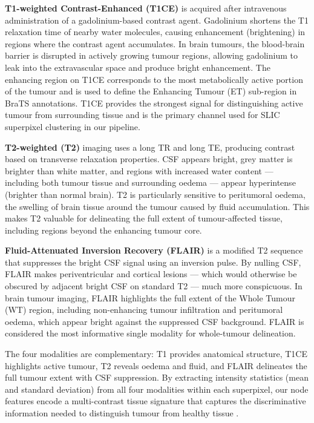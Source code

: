 \documentclass{article}
\begin{document}
\textbf{T1-weighted Contrast-Enhanced (T1CE)} is acquired after intravenous
administration of a gadolinium-based contrast agent. Gadolinium shortens the
T1 relaxation time of nearby water molecules, causing enhancement (brightening)
in regions where the contrast agent accumulates. In brain tumours, the
blood-brain barrier is disrupted in actively growing tumour regions, allowing
gadolinium to leak into the extravascular space and produce bright enhancement.
The enhancing region on T1CE corresponds to the most metabolically active
portion of the tumour and is used to define the Enhancing Tumour (ET)
sub-region in BraTS annotations. T1CE provides the strongest signal for
distinguishing active tumour from surrounding tissue and is the primary
channel used for SLIC superpixel clustering in our pipeline.

\textbf{T2-weighted (T2)} imaging uses a long TR and long TE, producing
contrast based on transverse relaxation properties. CSF appears bright,
grey matter is brighter than white matter, and regions with increased water
content --- including both tumour tissue and surrounding oedema --- appear
hyperintense (brighter than normal brain). T2 is particularly sensitive to
peritumoral oedema, the swelling of brain tissue around the tumour caused by
fluid accumulation. This makes T2 valuable for delineating the full extent of
tumour-affected tissue, including regions beyond the enhancing tumour core.

\textbf{Fluid-Attenuated Inversion Recovery (FLAIR)} is a modified T2
sequence that suppresses the bright CSF signal using an inversion pulse.
By nulling CSF, FLAIR makes periventricular and cortical lesions --- which
would otherwise be obscured by adjacent bright CSF on standard T2 --- much
more conspicuous. In brain tumour imaging, FLAIR highlights the full extent
of the Whole Tumour (WT) region, including non-enhancing tumour infiltration
and peritumoral oedema, which appear bright against the suppressed CSF
background. FLAIR is considered the most informative single modality for
whole-tumour delineation.

The four modalities are complementary: T1 provides anatomical structure, T1CE
highlights active tumour, T2 reveals oedema and fluid, and FLAIR delineates
the full tumour extent with CSF suppression. By extracting intensity statistics
(mean and standard deviation) from all four modalities within each superpixel,
our node features encode a multi-contrast tissue signature that captures the
discriminative information needed to distinguish tumour from healthy tissue
\cite{menze2015multimodal, louis2016glioma}.
\end{document}
